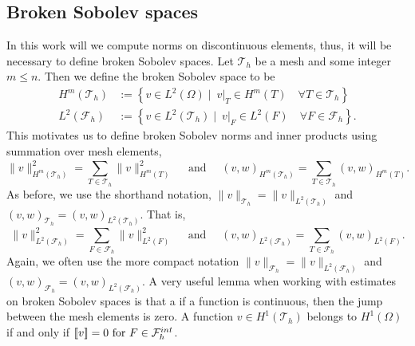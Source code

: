 \subsection{Broken Sobolev spaces}%
\label{sub:broken_sobolev_spaces}

In this work will we compute norms on discontinuous elements, thus, it will be necessary to define broken Sobolev spaces.
Let $\mathcal{T}_{h} $ be a mesh and some integer $m\le n$. Then we define the broken Sobolev space to be \[
    \begin{split}
H^{m}( \mathcal{T}_{h} ) & := \left\{ v \in L^2( \Omega )  \mid \ v|_{T} \in H^{m}( T) \quad     \forall T \in  \mathcal{T}_{h} \right\}\\
        L^{2}( \mathcal{F}_{h} ) &:= \left\{ v \in L^2( \mathcal{T}_{h}  )  \mid   \ v|_{F} \in L^{2}( F)  \quad  \forall F \in  \mathcal{F}_{h}   \right\}.
    \end{split}
\]
This motivates us to define broken Sobolev norms and inner products using summation over mesh elements,
\[
 \| v \|_{H^{m}( \mathcal{T}_{h} ) }^{2} = \sum_{T \in  \mathcal{T}_{h} }^{} \| v  \|_{ H^{m}( T ) }^{2  } \quad \text{ and } \quad
 (v ,w )_{H^{m}( \mathcal{T}_{h} ) }^{} = \sum_{T \in \mathcal{T} _{h}}^{} (v ,w )_{ H^{m}( T ) }^{  } .
\]
As before, we use the shorthand notation,  $\| v \|_{\mathcal{T}_{h}} =  \| v \|_{L^{2}( \mathcal{T}_{h} ) }$ and  $(v ,w )_{ \mathcal{T}_{h} }^{} = (v ,w )_{L^2( \mathcal{T}_{h} ) }^{} $.
That is,
\[
 \| v \|_{L^{2}( \mathcal{F}_{h} ) }^{2} = \sum_{F \in  \mathcal{F}_{h} }^{} \| v  \|_{ L^{2}( F ) }^{2  } \quad \text{ and } \quad
 (v ,w )_{L^{2}( \mathcal{F}_{h} ) }^{} = \sum_{T \in \mathcal{F} _{h}}^{} (v ,w )_{ L^{2}( F ) }^{  } .
\]
Again, we often use the more compact notation $\| v \|_{\mathcal{F}_{h}} =  \| v \|_{L^{2}( \mathcal{F}_{h} ) }$ and  $(v ,w )_{ \mathcal{F}_{h} }^{} = (v ,w )_{L^2( \mathcal{F}_{h} ) }^{} $.
A very useful lemma when working with estimates on broken Sobolev spaces is that a if a function is continuous, then the jump between the mesh elements is zero. A function $ v \in  H^{1}( \mathcal{T}_{h} ) $ belongs to $ H^{1}( \Omega )  $ if and only
if $ \left[\!\left[  v  \right]\!\right]   = 0 \text{ for }  F \in \mathcal{F}^{int}_{h}$.

